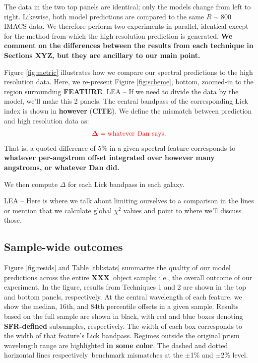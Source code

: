 \documentclass[a4paper,fleqn,usenatbib]{mnras}
\newcommand{\resp}{respectively}
\newcommand{\bfr}{\bf\color{red}}
\newcommand{\bfb}{\color{myblue}}
\newcommand{\ntot}{{\bfr XXX}} %
\newcommand{\CITE}{{\bfr CITE}}
\begin{document}
The data in the two top panels are identical; only the models change from left to right. Likewise,
both model predictions are compared to the same $R\sim800$ IMACS data. We therefore perform two 
experiments in parallel, identical except for the method from which the high resolution prediction is 
generated. {\bfr We comment on the differences between the results from each
technique in Sections XYZ, but they are ancillary to our main point.}

Figure \ref{fig:metric} illustrates how we compare our spectral predictions to the high resolution data.
Here, we re-present Figure \ref{fig:scheme}, bottom, zoomed-in to the region surrounding {\bfr FEATURE}.
{\bfb LEA -- If we need to divide the data by the model, we'll make this 2 panels.} The central 
bandpass of the corresponding Lick index is shown in {\bfr however} (\CITE). We define 
the mismatch between prediction and high resolution data as:
\begin{equation}
	\bfr \Delta = {\rm whatever~Dan~says}.
\end{equation}
That is, a quoted difference of 5\% in a given spectral feature corresponds to {\bfr whatever per-angstrom
offset integrated over however many angstroms, or whatever Dan did.}

We then compute {\bfr$\Delta$} for each Lick bandpass in each galaxy.

{\bfb LEA -- Here is where we talk about limiting ourselves to a comparison in the lines or mention
that we calculate global $\chi^{2}$ values and point to where we'll discuss those.}

\subsection{Sample-wide outcomes}
\label{sec:upshot}

Figure \ref{fig:resids} and Table \ref{tbl:stats} summarize the quality of our model predictions 
across the entire \ntot\ object sample; i.e., the overall outcome of our experiment. In the figure, 
results from Techniques 1 and 2 are shown in the top and bottom panels, \resp. At the central 
wavelength of each feature, we show the median, 16th, and 84th percentile offsets in a given sample. 
Results based on the full sample are shown in black, with red and blue boxes denoting 
{\bfr SFR-defined} subsamples, \resp. The width of each box corresponds to the width of 
that feature's Lick bandpass. Regimes outside the original prism wavelength range are highlighted 
{\bfr in some color}. The dashed and dotted horizontal lines \resp\ benchmark mismatches at the 
$\pm$1\% and $\pm$2\% level.
\end{document}
